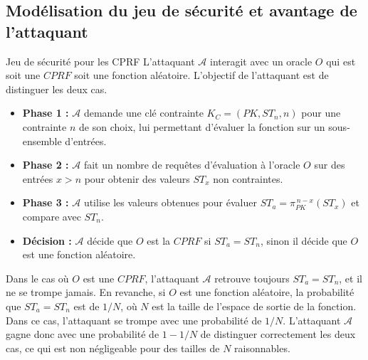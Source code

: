 \documentclass[9pt]{extarticle}
\begin{document}
\subsection{Modélisation du jeu de sécurité et avantage de l’attaquant}
\begin{defbox}{Jeu de sécurité pour les CPRF}
L'attaquant $\mathcal{A}$ interagit avec un oracle $O$ qui est soit une $CPRF$ soit une fonction aléatoire. 
L’objectif de l'attaquant est de distinguer les deux cas.
\begin{itemize}
\item \textbf{Phase 1 :} $\mathcal{A}$ demande une clé contrainte $K_C = (PK, ST_n, n)$ pour une contrainte $n$ de son choix, lui permettant d’évaluer la fonction sur un sous-ensemble d’entrées.
\item \textbf{Phase 2 :} $\mathcal{A}$ fait un nombre de requêtes d’évaluation à l’oracle $O$ sur des entrées $x > n$ pour obtenir des valeurs $ST_x$ non contraintes.
\item \textbf{Phase 3 :} $\mathcal{A}$ utilise les valeurs obtenues pour évaluer $ST_a = \pi_{PK}^{\,n-x}(ST_x)$ et compare avec $ST_n$.
\item \textbf{Décision :} $\mathcal{A}$ décide que $O$ est la $CPRF$ si $ST_a = ST_n$, sinon il décide que $O$ est une fonction aléatoire.
\end{itemize}
Dans le cas où $O$ est une $CPRF$, l'attaquant $\mathcal{A}$ retrouve toujours $ST_a = ST_n$, et il ne se trompe jamais. En revanche, si $O$ est une fonction aléatoire, la probabilité que $ST_a = ST_n$ est de $1/N$, où $N$ est la taille de l’espace de sortie de la fonction. Dans ce cas, l'attaquant se trompe avec une probabilité de $1/N$.
L'attaquant $\mathcal{A}$ gagne donc avec une probabilité de $1 - 1/N$ de distinguer correctement les deux cas, ce qui est non négligeable pour des tailles de $N$ raisonnables.\\

\begin{figure}[H]
  \centering
{}
\end{figure}
\end{defbox}
\end{document}

